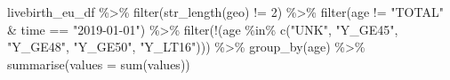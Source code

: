 \documentclass[
]{article}
\newenvironment{Shaded}{\begin{snugshade}}{\end{snugshade}}
\newcommand{\AttributeTok}[1]{\textcolor[rgb]{0.77,0.63,0.00}{#1}}
\newcommand{\DecValTok}[1]{\textcolor[rgb]{0.00,0.00,0.81}{#1}}
\newcommand{\FunctionTok}[1]{\textcolor[rgb]{0.00,0.00,0.00}{#1}}
\newcommand{\NormalTok}[1]{#1}
\newcommand{\SpecialCharTok}[1]{\textcolor[rgb]{0.00,0.00,0.00}{#1}}
\newcommand{\StringTok}[1]{\textcolor[rgb]{0.31,0.60,0.02}{#1}}
\begin{document}
\begin{Shaded}
\begin{Highlighting}[]
\NormalTok{livebirth\_eu\_df }\SpecialCharTok{\%\textgreater{}\%} 
  \FunctionTok{filter}\NormalTok{(}\FunctionTok{str\_length}\NormalTok{(geo) }\SpecialCharTok{!=} \DecValTok{2}\NormalTok{) }\SpecialCharTok{\%\textgreater{}\%} 
  \FunctionTok{filter}\NormalTok{(age }\SpecialCharTok{!=} \StringTok{"TOTAL"} \SpecialCharTok{\&}\NormalTok{ time }\SpecialCharTok{==} \StringTok{"2019{-}01{-}01"}\NormalTok{) }\SpecialCharTok{\%\textgreater{}\%} 
  \FunctionTok{filter}\NormalTok{(}\SpecialCharTok{!}\NormalTok{(age }\SpecialCharTok{\%in\%} \FunctionTok{c}\NormalTok{(}\StringTok{"UNK"}\NormalTok{, }\StringTok{"Y\_GE45"}\NormalTok{, }\StringTok{"Y\_GE48"}\NormalTok{, }\StringTok{"Y\_GE50"}\NormalTok{, }\StringTok{"Y\_LT16"}\NormalTok{))) }\SpecialCharTok{\%\textgreater{}\%} 
  \FunctionTok{group\_by}\NormalTok{(age) }\SpecialCharTok{\%\textgreater{}\%}
  \FunctionTok{summarise}\NormalTok{(}\AttributeTok{values =} \FunctionTok{sum}\NormalTok{(values))}
\end{Highlighting}
\end{Shaded}
\end{document}
